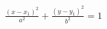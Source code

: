 \documentclass[preview]{standalone}
\begin{document}
\begin{align*}
\frac{(x - x_1)^2}{a^2} + \frac{(y - y_1)^2}{b^2} = 1
\end{align*}
\end{document}
